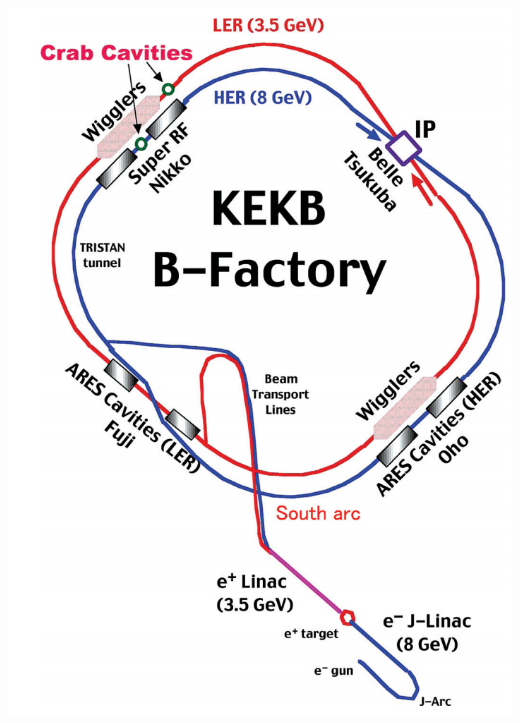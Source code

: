 \documentclass[serif]{beamer}
\begin{document}
\begin{frame}[t]
\begin{columns}
	\includegraphics[scale=0.2]{fig/setup/KEKB}	
\end{columns}

\end{frame}

\end{document}
